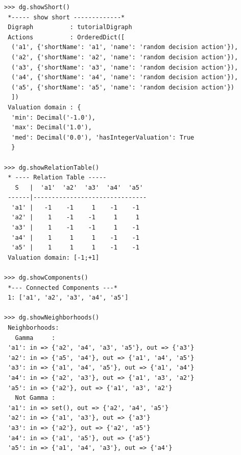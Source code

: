 \begin{lstlisting}[caption={Random crisp digraph object},label=list:1.3]
>>> dg.showShort()
 *----- show short -------------*
 Digraph          : tutorialDigraph
 Actions          : OrderedDict([
  ('a1', {'shortName': 'a1', 'name': 'random decision action'}),
  ('a2', {'shortName': 'a2', 'name': 'random decision action'}),
  ('a3', {'shortName': 'a3', 'name': 'random decision action'}),
  ('a4', {'shortName': 'a4', 'name': 'random decision action'}),
  ('a5', {'shortName': 'a5', 'name': 'random decision action'})
  ])
 Valuation domain : {
  'min': Decimal('-1.0'),
  'max': Decimal('1.0'),
  'med': Decimal('0.0'), 'hasIntegerValuation': True
  }

>>> dg.showRelationTable()
 * ---- Relation Table -----
   S   |  'a1'  'a2'  'a3'  'a4'  'a5'
 ------|-------------------------------
  'a1' |   -1    -1     1    -1    -1
  'a2' |    1    -1    -1     1     1
  'a3' |    1    -1    -1     1    -1
  'a4' |    1     1     1    -1    -1
  'a5' |    1     1     1    -1    -1
 Valuation domain: [-1;+1]

>>> dg.showComponents()
 *--- Connected Components ---*
 1: ['a1', 'a2', 'a3', 'a4', 'a5']

>>> dg.showNeighborhoods()
 Neighborhoods:
   Gamma     :
 'a1': in => {'a2', 'a4', 'a3', 'a5'}, out => {'a3'}
 'a2': in => {'a5', 'a4'}, out => {'a1', 'a4', 'a5'}
 'a3': in => {'a1', 'a4', 'a5'}, out => {'a1', 'a4'}
 'a4': in => {'a2', 'a3'}, out => {'a1', 'a3', 'a2'}
 'a5': in => {'a2'}, out => {'a1', 'a3', 'a2'}
   Not Gamma :
 'a1': in => set(), out => {'a2', 'a4', 'a5'}
 'a2': in => {'a1', 'a3'}, out => {'a3'}
 'a3': in => {'a2'}, out => {'a2', 'a5'}
 'a4': in => {'a1', 'a5'}, out => {'a5'}
 'a5': in => {'a1', 'a4', 'a3'}, out => {'a4'}
\end{lstlisting}


